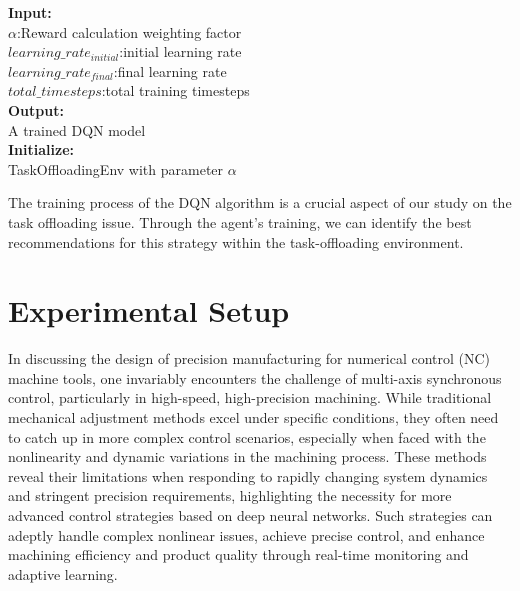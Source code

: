 \documentclass[preprint,12pt,authoryear]{elsarticle}
\begin{document}
\begin{algorithm}[H]
    \caption{DQN Training for Task Offloading}
    \textbf{Input:}\\
        $\alpha$:Reward calculation weighting factor\\
        $learning\_rate_{initial}$:initial learning rate\\
        $learning\_rate_{final}$:final learning rate\\
        $total\_timesteps$:total training timesteps\\
    \textbf{Output:}
    \\A trained DQN model\\
    \textbf{Initialize:}
    \\TaskOffloadingEnv with parameter $\alpha$\\
\end{algorithm}

The training process of the DQN algorithm is a crucial aspect of our study on the task offloading issue. Through the agent's training, we can identify the best recommendations for this strategy within the task-offloading environment.

\section{Experimental Setup}

In discussing the design of precision manufacturing for numerical control (NC) machine tools, one invariably encounters the challenge of multi-axis synchronous control, particularly in high-speed, high-precision machining. While traditional mechanical adjustment methods excel under specific conditions, they often need to catch up in more complex control scenarios, especially when faced with the nonlinearity and dynamic variations in the machining process. These methods reveal their limitations when responding to rapidly changing system dynamics and stringent precision requirements, highlighting the necessity for more advanced control strategies based on deep neural networks. Such strategies can adeptly handle complex nonlinear issues, achieve precise control, and enhance machining efficiency and product quality through real-time monitoring and adaptive learning.
\end{document}
